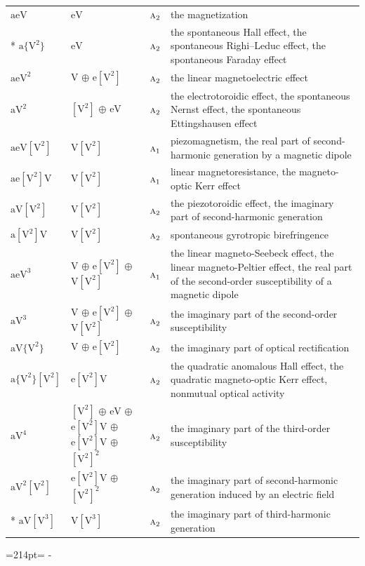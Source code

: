 \documentclass[10pt,a4paper]{article}
\newcommand{\needspace}[1]{\par\penalty-100\begingroup\dimen0=#1\relax\dimen2=\pagegoal
  \advance\dimen2-\pagetotal\ifdim\dimen0>\dimen2\relax\ifdim\dimen2>0pt\vfil\break\fi\fi
  \endgroup}
\numberwithin{equation}{section}
\newcommand{\irr}[1]{\text{\normalfont\scshape #1}}
\newcommand{\jahn}[1]{\mathrm{#1}}
\newlength{\fillwidth}\newlength{\cellwidth}\newlength{\colwidth}
\begin{document}
{\begin{longtable}{@{}lll>{\RaggedRight\arraybackslash}p{\fillwidth}@{}}
\bottomrule\endfoot\endlastfoot
$\jahn{aeV}$ & $\jahn{eV}$ & $\irr{a}_{2}$ & the magnetization\\*
$\jahn{a\{V^{2}\}}$ & $\jahn{eV}$ & $\irr{a}_{2}$ & the spontaneous Hall effect, the spontaneous Righi–Leduc effect, the spontaneous Faraday effect\\
$\jahn{aeV^{2}}$ & $\jahn{V}$ $\oplus$ $\jahn{e[V^{2}]}$ & $\irr{a}_{2}$ & the linear magnetoelectric effect\\
$\jahn{aV^{2}}$ & $\jahn{[V^{2}]}$ $\oplus$ $\jahn{eV}$ & $\irr{a}_{2}$ & the electrotoroidic effect, the spontaneous Nernst effect, the spontaneous Ettingshausen effect\\
$\jahn{aeV[V^{2}]}$ & $\jahn{V[V^{2}]}$ & $\irr{a}_{1}$ & piezomagnetism, the real part of second-harmonic generation by a magnetic dipole\\
$\jahn{ae[V^{2}]V}$ & $\jahn{V[V^{2}]}$ & $\irr{a}_{1}$ & linear magnetoresistance, the magneto-optic Kerr effect\\
$\jahn{aV[V^{2}]}$ & $\jahn{V[V^{2}]}$ & $\irr{a}_{2}$ & the piezotoroidic effect, the imaginary part of second-harmonic generation\\
$\jahn{a[V^{2}]V}$ & $\jahn{V[V^{2}]}$ & $\irr{a}_{2}$ & spontaneous gyrotropic birefringence\\
$\jahn{aeV^{3}}$ & $\jahn{V}$ $\oplus$ $\jahn{e[V^{2}]}$ $\oplus$ $\jahn{V[V^{2}]}$ & $\irr{a}_{1}$ & the linear magneto-Seebeck effect, the linear magneto-Peltier effect, the real part of the second-order susceptibility of a magnetic dipole\\
$\jahn{aV^{3}}$ & $\jahn{V}$ $\oplus$ $\jahn{e[V^{2}]}$ $\oplus$ $\jahn{V[V^{2}]}$ & $\irr{a}_{2}$ & the imaginary part of the second-order susceptibility\\
$\jahn{aV\{V^{2}\}}$ & $\jahn{V}$ $\oplus$ $\jahn{e[V^{2}]}$ & $\irr{a}_{2}$ & the imaginary part of optical rectification\\
$\jahn{a\{V^{2}\}[V^{2}]}$ & $\jahn{e[V^{2}]V}$ & $\irr{a}_{2}$ & the quadratic anomalous Hall effect, the quadratic magneto-optic Kerr effect, nonmutual optical activity\\
$\jahn{aV^{4}}$ & $\jahn{[V^{2}]}$ $\oplus$ $\jahn{eV}$ $\oplus$ $\jahn{e[V^{2}]V}$ $\oplus$ $\jahn{e[V^{2}]V}$ $\oplus$ $\jahn{[V^{2}]^{2}}$ & $\irr{a}_{2}$ & the imaginary part of the third-order susceptibility\\
$\jahn{aV^{2}[V^{2}]}$ & $\jahn{e[V^{2}]V}$ $\oplus$ $\jahn{[V^{2}]^{2}}$ & $\irr{a}_{2}$ & the imaginary part of second-harmonic generation induced by an electric field\\*
$\jahn{aV[V^{3}]}$ & $\jahn{V[V^{3}]}$ & $\irr{a}_{2}$ & the imaginary part of third-harmonic generation\\
\bottomrule\end{longtable}}
\needspace{214pt}
\end{document}
